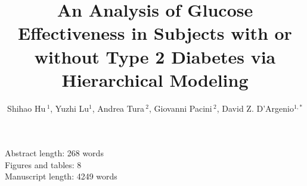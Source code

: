 \documentclass[utf8]{frontiersSCNS} %
\def\firstAuthorLast{Hu {et~al.}} %
\def\Authors{Shihao Hu\,$^{1}$, Yuzhi Lu$^{1}$, Andrea Tura\,$^{2}$, Giovanni Pacini\,$^{2}$, David Z. D’Argenio$^{1,*}$}
\begin{document}
\onecolumn
{}

\title[Hierarchical Modeling  of Glucose Effectiveness]{An Analysis of Glucose Effectiveness in Subjects with or without Type 2 Diabetes via Hierarchical Modeling} 

\author[\firstAuthorLast ]{\Authors} %
\address{} %
\correspondance{} %

\extraAuth{}%

\maketitle
Abstract length: 268 words\\
Figures and tables: 8 \\
Manuscript length: 4249 words 
\end{document}
